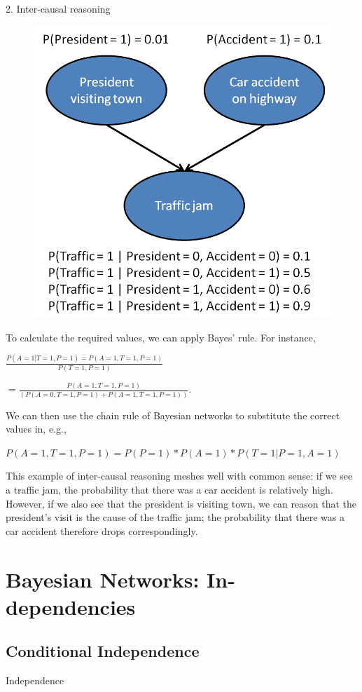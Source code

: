 \documentclass{book}
\begin{document}
2. Inter-causal reasoning

\begin{figure}[h]
\centering
\includegraphics[width=0.7\linewidth]{figures/bayesian_ex1}
\caption{}
\label{fig:bayesianex1}
\end{figure}

To calculate the required values, we can apply Bayes' rule. For instance,

$\frac{P(A=1|T=1,P=1)=P(A=1,T=1,P=1)}{P(T=1,P=1)}$

$=\frac{P(A=1,T=1,P=1)}{(P(A=0,T=1,P=1)+P(A=1,T=1,P=1))}$.

We can then use the chain rule of Bayesian networks to substitute the correct values in, e.g.,

$P(A=1,T=1,P=1)=P(P=1)*P(A=1)*P(T=1|P=1,A=1)$

This example of inter-causal reasoning meshes well with common sense: if we see a traffic jam, the probability that there was a car accident is relatively high. However, if we also see that the president is visiting town, we can reason that the president's visit is the cause of the traffic jam; the probability that there was a car accident therefore drops correspondingly.

\section{Bayesian Networks: In-dependencies}
\subsection{Conditional Independence}

Independence
\end{document}
